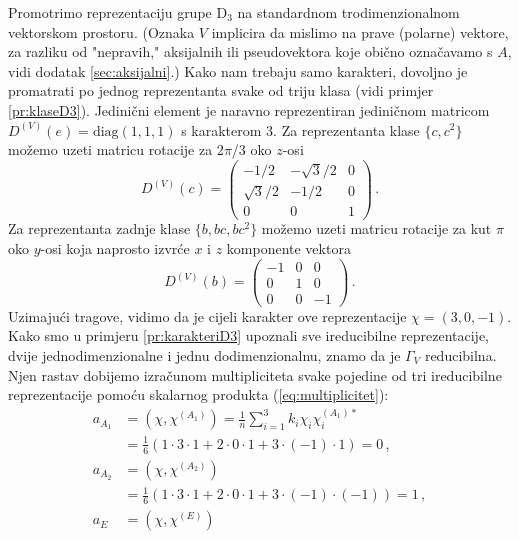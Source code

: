 \begin{primjer}
     
Promotrimo reprezentaciju grupe D$_3$ na standardnom trodimenzionalnom
vektorskom prostoru. (Oznaka $V$ implicira da mislimo na prave (polarne)
vektore, za razliku od "nepravih," aksijalnih ili pseudovektora koje obično
označavamo s $A$, vidi dodatak \ref{sec:aksijalni}.) Kako nam trebaju samo
karakteri, dovoljno je promatrati po jednog reprezentanta svake od triju klasa
(vidi primjer \ref{pr:klaseD3}).
Jedinični element je naravno reprezentiran jediničnom matricom
$D^{(V)}(e)=\textrm{diag}(1,1,1)$ s karakterom 3.
Za reprezentanta klase $\{c, c^2\}$ možemo uzeti matricu rotacije
za 2$\pi$/3 oko $z$-osi
\begin{equation}
D^{(V)}(c)=
\begin{pmatrix}
-1/2 & -\sqrt{3}/2 & 0 \\
\sqrt{3}/2 & -1/2 & 0 \\
0 & 0 & 1
\end{pmatrix} \,.
\end{equation}
Za reprezentanta zadnje klase $\{b, bc, bc^2\}$ možemo uzeti matricu
rotacije za kut $\pi$ oko $y$-osi  koja naprosto izvrće $x$ i $z$
komponente vektora
\begin{equation}
D^{(V)}(b)=
\begin{pmatrix}
-1 & 0 & 0 \\
0 & 1 & 0 \\
0 & 0 & -1
\end{pmatrix} \,.
\label{eq:DVbD3}
\end{equation}
Uzimajući tragove, vidimo da je cijeli karakter ove reprezentacije
$\chi=(3,0,-1)$.
Kako smo u primjeru \ref{pr:karakteriD3} upoznali sve ireducibilne
reprezentacije, dvije jednodimenzionalne i jednu dodimenzionalnu,
znamo da je $\Gamma_V$ reducibilna. Njen rastav dobijemo izračunom 
multipliciteta svake pojedine od tri
ireducibilne reprezentacije pomoću skalarnog produkta (\ref{eq:multiplicitet}):
\begin{align*}
    a_{A_1}& = (\chi, \chi^{(A_1)})=\frac{1}{n}\sum_{i=1}^{3} k_i \chi_i \chi^{(A_1)*}_i \\
 & = \frac{1}{6}(1\cdot 3\cdot 1 + 2\cdot 0\cdot 1 + 3\cdot (-1) \cdot 1)=0 \,, \\
    a_{A_2}& = (\chi, \chi^{(A_2)}) \\
 & =\frac{1}{6}(1\cdot 3\cdot 1 + 2\cdot 0\cdot 1 + 3\cdot (-1)\cdot(-1))=1 \,, \\
    a_{E}& = (\chi, \chi^{(E)}) \\

\end{align*}
\end{primjer}

